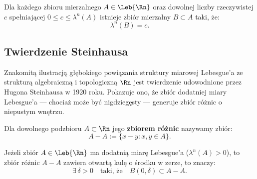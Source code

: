 \begin{wn}
    Dla każdego zbioru mierzalnego $A \in \Leb{\Rn}$ oraz dowolnej liczby rzeczywistej $c$ spełniającej $0 \le c \le \lambda^n(A)$ istnieje zbiór mierzalny $B \subset A$ taki, że:
    \begin{equation}
        \lambda^n(B) = c.
    \end{equation}
\end{wn}

\subsection{Twierdzenie Steinhausa}

Znakomitą ilustracją głębokiego powiązania struktury miarowej Lebesgue'a ze strukturą algebraiczną i topologiczną $\Rn$ jest twierdzenie udowodnione przez Hugona Steinhausa w 1920 roku. Pokazuje ono, że zbiór dodatniej miary Lebesgue'a — chociaż może być nigdziegęsty — generuje zbiór różnic o niepustym wnętrzu.

\begin{defi}
    Dla dowolnego podzbioru $A \subset \Rn$ jego \textbf{zbiorem różnic} nazywamy zbiór:
    \begin{equation}
        A - A := \{x - y \colon x, y \in A\}.
    \end{equation}
\end{defi}

\begin{tw}\label{tw:steinhaus}
    Jeżeli zbiór $A \in \Leb{\Rn}$ ma dodatnią miarę Lebesgue'a ($\lambda^n(A) > 0$), to zbiór różnic $A - A$ zawiera otwartą kulę o środku w zerze, to znaczy:
    \begin{equation}
        \exists \, \delta > 0 \quad \text{taki, że} \quad B(0, \delta) \subset A - A.
    \end{equation}
\end{tw}

